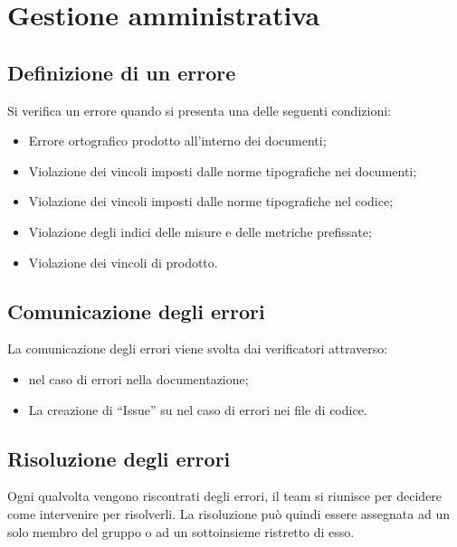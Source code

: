 \documentclass[../PianoDiQualifica.tex]{subfiles}
\begin{document}
	\section{Gestione amministrativa}
		\subsection{Definizione di un errore}
		Si verifica un errore quando si presenta una delle seguenti condizioni:
		\begin{itemize}
			\item Errore ortografico prodotto all'interno dei documenti;
			\item Violazione dei vincoli imposti dalle norme tipografiche nei documenti;
			\item Violazione dei vincoli imposti dalle norme tipografiche nel codice;
			\item Violazione degli indici delle misure e delle metriche prefissate;
			\item Violazione dei vincoli di prodotto.
		\end{itemize}
		\subsection{Comunicazione degli errori}
			La comunicazione degli errori viene svolta dai verificatori attraverso:
			\begin{itemize}
				\item {} nel caso di errori nella documentazione;
				\item La creazione di ``Issue'' su  nel caso di errori nei file di codice.
			\end{itemize}
		\subsection{Risoluzione degli errori}
			Ogni qualvolta vengono riscontrati degli errori, il team si riunisce per
			decidere come intervenire per risolverli. La risoluzione può quindi essere
			assegnata ad un solo membro del gruppo o ad un sottoinsieme ristretto
			di esso.
\end{document}
